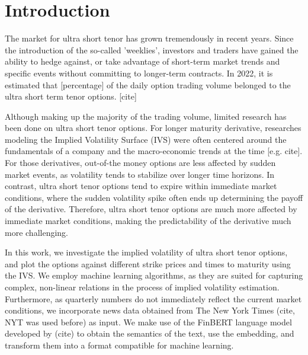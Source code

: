 \section{Introduction} \label{introduction}
The market for ultra short tenor has grown tremendously in recent years. Since the introduction of the so-called 'weeklies', investors and traders have gained the ability to hedge against, or take advantage of short-term market trends and specific events without committing to longer-term contracts. In 2022, it is estimated that [percentage] of the daily option trading volume belonged to the ultra short term tenor options. [cite] %

Although making up the majority of the trading volume, limited research has been done on ultra short tenor options. For longer maturity derivative, researches modeling the Implied Volatility Surface (IVS) were often centered around the fundamentals of a company and the macro-economic trends at the time [e.g. cite]. For those derivatives, out-of-the money options are less affected by sudden market events, as volatility tends to stabilize over longer time horizons. In contrast, ultra short tenor options tend to expire within immediate market conditions, where the sudden volatility spike often ends up determining the payoff of the derivative. Therefore, ultra short tenor options are much more affected by immediate market conditions, making the predictability of the derivative much more challenging.


In this work, we investigate the implied volatility of ultra short tenor options, and plot the options against different strike prices and times to maturity using the IVS. We employ machine learning algorithms, as they are suited for capturing complex, non-linear relations in the process of implied volatility estimation. Furthermore, as quarterly numbers do not immediately reflect the current market conditions, we incorporate news data obtained from The New York Times (cite, NYT was used before) as input. We make use of the FinBERT language model developed by (cite) to obtain the semantics of the text, use the embedding, and transform them into a format compatible for machine learning. 


